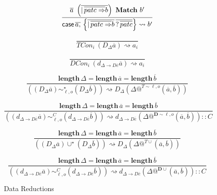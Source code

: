 \begin{figure}
\[
\frac{
  \overline{a}\ \left(\overline{|\,\overline{patc\Rightarrow}b}\right)\ \mathbf{Match}\ b'
}{
  \case{} \,\overline{a,}\,\left\{ \overline{|\,\overline{patc\Rightarrow}b}\, \overline{?\,\overline{patc}} \right\} \rightsquigarrow b'
}
\]

\[
\frac{\ }{TCon_{i}\ \left(D_{\Delta}\overline{a}\right)\rightsquigarrow a_{i}}
\]

\[
\frac{\ }{DCon_{i}\ \left(d_{\Delta\rightarrow D\overline{e}}\overline{a}\right)\rightsquigarrow a_{i}}
\]

\[
\frac{
  \mathbf{length}\,\Delta=\mathbf{length}\,\overline{a}=\mathbf{length}\,\overline{b}
}{
  \left(\left(D_{\Delta}\overline{a}\right)\sim_{\ell,o}^{\star}\left(D_{\Delta}\overline{b}\right)\right)\rightsquigarrow D_{\Delta}\left(\Delta@^{T\sim\ell,o}\left(\overline{a},\overline{b}\right)\right)}
\]

\[
\frac{
  \mathbf{length}\,\Delta=\mathbf{length}\,\overline{a}=\mathbf{length}\,\overline{b}
}{
  \left(\left(d_{\Delta\rightarrow D\overline{e}}\overline{a}\right)\sim_{\ell,o}^{C}\left(d_{\Delta\rightarrow D\overline{e}}\overline{b}\right)\right)\rightsquigarrow d_{\Delta\rightarrow D\overline{e}}\left(\Delta@^{\mathbf{D}\sim\ell,o}\left(\overline{a},\overline{b}\right)\right)::C}
\]

\[
\frac{
  \mathbf{length}\,\Delta=\mathbf{length}\,\overline{a}=\mathbf{length}\,\overline{b}
  }{\left(\left(D_{\Delta}\overline{a}\right)\cup^{\star}\left(D_{\Delta}\overline{b}\right)\right)\rightsquigarrow D_{\Delta}\left(\Delta@^{T\cup}\left(\overline{a},\overline{b}\right)\right)}
\]

\[
\frac{
  \mathbf{length}\,\Delta=\mathbf{length}\,\overline{a}=\mathbf{length}\,\overline{b}
}{
  \left(\left(d_{\Delta\rightarrow D\overline{e}}\overline{a}\right)\sim_{\ell,o}^{C}\left(d_{\Delta\rightarrow D\overline{e}}\overline{b}\right)\right)\rightsquigarrow d_{\Delta\rightarrow D\overline{e}}\left(\Delta@^{\mathbf{D}\cup}\left(\overline{a},\overline{b}\right)\right)::C}
\]
\caption{Data Reductions}
\label{fig:Data-Reductions}
\end{figure}


